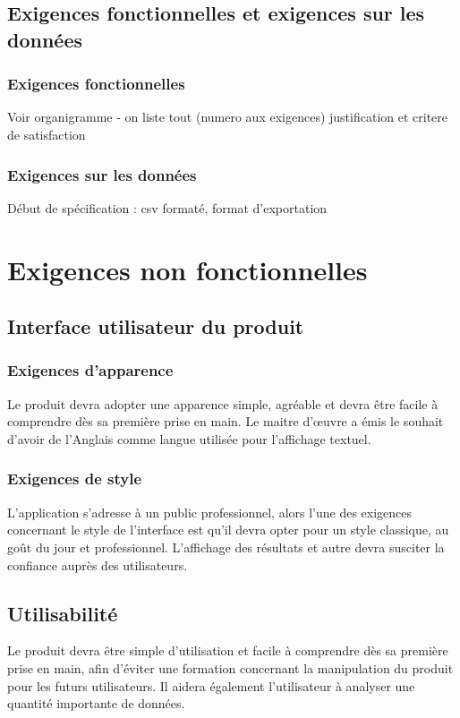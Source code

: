 		\subsection{Exigences fonctionnelles et exigences sur les données}
		
			\subsubsection{Exigences fonctionnelles}
				{\color{red} Voir organigramme - on liste tout (numero aux exigences) justification et critere de satisfaction }
				
			\subsubsection{Exigences sur les données}
				{\color{red} Début de spécification : csv formaté, format d'exportation}
	
	
	\section{Exigences non fonctionnelles}
		\subsection{Interface utilisateur du produit}
		
			\subsubsection{Exigences d’apparence} 
			Le produit devra adopter une apparence simple, agréable et devra être facile à comprendre dès sa première prise en main.
			Le maitre d’œuvre a émis le souhait d’avoir de l’Anglais comme langue utilisée pour l’affichage textuel.

			\subsubsection{Exigences de style}
			L’application s’adresse à un public professionnel, alors l’une des exigences concernant le style de l’interface est qu’il devra opter pour un style classique, au goût du jour et professionnel. L’affichage des résultats et autre devra susciter la confiance auprès des utilisateurs.

		\subsection{Utilisabilité}
		Le produit devra être simple d’utilisation et facile à comprendre dès sa première prise en main, afin d’éviter une formation concernant la manipulation du produit pour les futurs utilisateurs.
		Il aidera également l’utilisateur à analyser une quantité importante de données.

